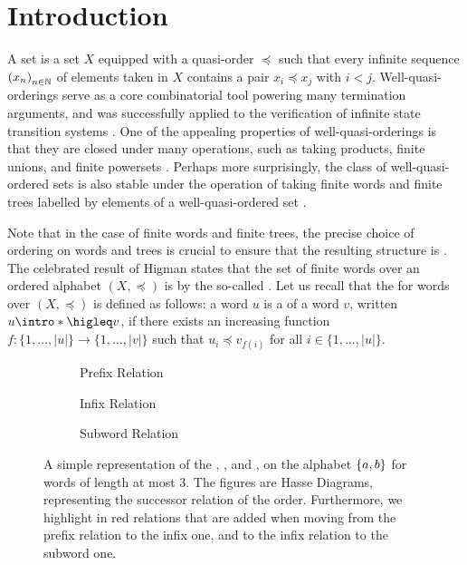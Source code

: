 \section{Introduction}
\label{introduction:sec}

A  set is a set $X$ equipped with a quasi-order
$\preceq$ such that every infinite sequence $\seqof{x_n}$ of elements taken in
$X$ contains a pair $x_i \preceq x_j$ with $i < j$. Well-quasi-orderings serve
as a core combinatorial tool powering many termination arguments, and was
successfully applied to the verification of infinite state transition systems
\cite{ABDU96,ABDU98}. One of the appealing properties of well-quasi-orderings
is that they are closed under many operations, such as taking products, finite
unions, and finite powersets \cite{SCSC12}. Perhaps more surprisingly, the
class of well-quasi-ordered sets is also stable under the operation of taking
finite words and finite trees labelled by elements of a well-quasi-ordered set
\cite{HIG52,KRU72}.

\AP
Note that in the case of finite words and finite trees, the precise choice of
ordering on words and trees is crucial to ensure that the resulting structure
is . The celebrated result of Higman states that the set
of finite words over an ordered alphabet $(X, \preceq)$ is
 by the so-called 
\cite{HIG52}. Let us recall that the  for words over $(X,
\preceq)$ is defined as follows: a word $u$ is a  of a word $v$,
written $u \intro*\higleq v$,
if there exists an increasing function $f \colon \{1, \ldots, |u|\} \to \{1,
\ldots, |v|\}$ such that $u_i \preceq v_{f(i)}$ for all $i \in \{1, \ldots,
|u|\}$.

\begin{figure}
    \centering
    \begin{subfigure}[t]{0.48\textwidth}
    	\centering
    	
    	\caption{Prefix Relation}
   	\end{subfigure}%
   	\hfill%
   	\begin{subfigure}[t]{0.48\textwidth}
   		\centering
   		
   		\caption{Infix Relation}
   	\end{subfigure}
   	\begin{subfigure}[t]{0.48\textwidth}
   		\centering
   		
   		\caption{Subword Relation}
   	\end{subfigure}
   	
   	\caption{A simple representation of the ,
        ,
        and ,
        on the alphabet $\{ a,b \}$ for words of
        length at most $3$. The figures are Hasse Diagrams,
        representing the successor relation of the order.
        Furthermore, we highlight in red relations that are added
        when moving from the prefix relation to the infix one,
        and to the infix relation to the subword one.}
    \label{word-embeddings:fig}
\end{figure}

